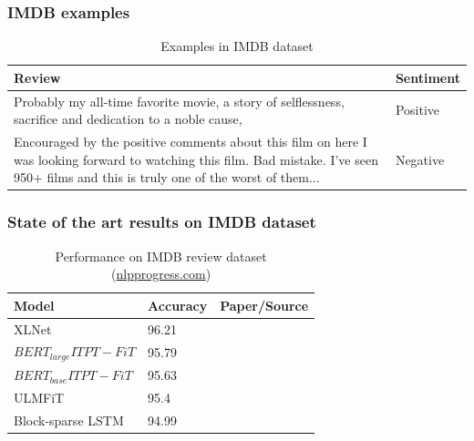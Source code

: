\documentclass{beamer}
\begin{document}
\begin{frame}
    \frametitle{IMDB examples}
    
    \begin{table}
    \begin{tabular}{p{8cm} l}
    \toprule
    \textbf{Review} & \textbf{Sentiment} \\
    \midrule
    Probably my all-time favorite movie, a story of selflessness, sacrifice and dedication to a noble cause, & Positive  \\
    \midrule
    Encouraged by the positive comments about this film on here I was looking forward to watching this film. Bad mistake. I've seen 950+ films and this is truly one of the worst of them...  & Negative  \\
    \bottomrule
    \end{tabular}
    \caption{Examples in IMDB dataset}
    \end{table}
\end{frame}
\begin{frame}
    \frametitle{State of the art results on IMDB dataset}
    
    \begin{table}
    \begin{tabular}{l l p{5cm}}
    \toprule
    \textbf{Model} & \textbf{Accuracy} & \textbf{Paper/Source}\\
    \midrule
    XLNet & 96.21 & \parencite{yang2019xlnet} \\
    $BERT_{large} ITPT-FiT$ & 95.79 & \parencite{sun2019finetune} \\
    $BERT_{base} ITPT-FiT$ & 95.63 & \parencite{sun2019finetune} \\
    ULMFiT & 95.4 &  \parencite{howard2018universal} \\ 
    Block-sparse LSTM & 94.99 & \parencite{Gray2017GPUKF} \\ 
    \bottomrule
    \end{tabular}
    \caption{Performance on IMDB review dataset (\href{http://nlpprogress.com/english/sentiment_analysis.html}{nlpprogress.com})}
    \end{table}
\end{frame}
\end{document}
